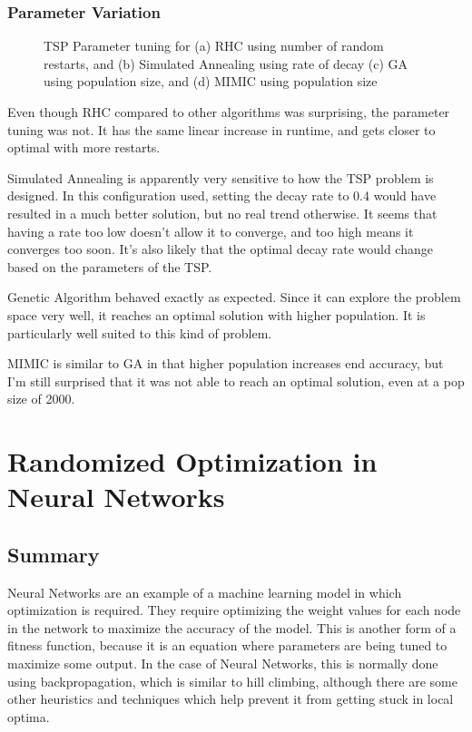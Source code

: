 \documentclass[
	letterpaper, %
]{mlreport}
\begin{document}
\subsubsection{Parameter Variation}
\begin{figure}
	\centering
	\caption{TSP Parameter tuning for (a) RHC using number of random restarts, and (b) Simulated Annealing using rate of decay (c) GA using population size, and (d) MIMIC using population size}
	\label{fig:fig6}
\end{figure}
Even though RHC compared to other algorithms was surprising, the parameter tuning was not. It has the same linear increase in runtime, and gets closer to optimal with more restarts.

Simulated Annealing is apparently very sensitive to how the TSP problem is designed. In this configuration used, setting the decay rate to 0.4 would have resulted in a much better solution, but no real trend otherwise. It seems that having a rate too low doesn't allow it to converge, and too high means it converges too soon. It's also likely that the optimal decay rate would change based on the parameters of the TSP.

Genetic Algorithm behaved exactly as expected. Since it can explore the problem space very well, it reaches an optimal solution with higher population. It is particularly well suited to this kind of problem.

MIMIC is similar to GA in that higher population increases end accuracy, but I'm still surprised that it was not able to reach an optimal solution, even at a pop size of 2000.

\section{Randomized Optimization in Neural Networks}
\subsection{Summary}
Neural Networks are an example of a machine learning model in which optimization is required. They require optimizing the weight values for each node in the network to maximize the accuracy of the model. This is another form of a fitness function, because it is an equation where parameters are being tuned to maximize some output. In the case of Neural Networks, this is normally done using backpropagation, which is similar to hill climbing, although there are some other heuristics and techniques which help prevent it from getting stuck in local optima.
\end{document}
